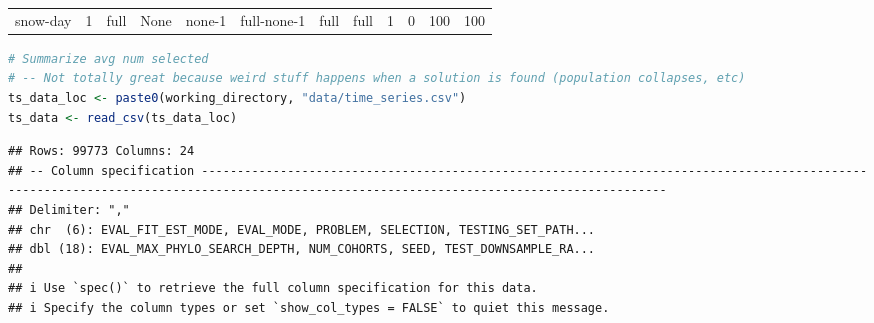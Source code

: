 \documentclass[
]{book}
\begin{document}
\begin{table}
\begin{tabular}{l|l|l|l|l|l|l|l|l|r|r|r}
\hline
\cellcolor{gray!6}{snow-day} & \cellcolor{gray!6}{0.1} & \cellcolor{gray!6}{phylo-informed-sample} & \cellcolor{gray!6}{Ancestor} & \cellcolor{gray!6}{ancestor-8} & \cellcolor{gray!6}{phylo-informed-sample-ancestor-8} & \cellcolor{gray!6}{phylo-informed-sample} & \cellcolor{gray!6}{phylo-informed-sample} & \cellcolor{gray!6}{8} & \cellcolor{gray!6}{4} & \cellcolor{gray!6}{50} & \cellcolor{gray!6}{46}\\
\hline
snow-day & 1 & full & None & none-1 & full-none-1 & full & full & 1 & 0 & 100 & 100\\
\hline
\end{tabular}
\endgroup{}
\end{table}

\begin{lstlisting}[language=R]
# Summarize avg num selected
# -- Not totally great because weird stuff happens when a solution is found (population collapses, etc)
ts_data_loc <- paste0(working_directory, "data/time_series.csv")
ts_data <- read_csv(ts_data_loc)
\end{lstlisting}

\begin{lstlisting}
## Rows: 99773 Columns: 24
## -- Column specification -----------------------------------------------------------------------------------------------------------------------------------------------------------------------------------------
## Delimiter: ","
## chr  (6): EVAL_FIT_EST_MODE, EVAL_MODE, PROBLEM, SELECTION, TESTING_SET_PATH...
## dbl (18): EVAL_MAX_PHYLO_SEARCH_DEPTH, NUM_COHORTS, SEED, TEST_DOWNSAMPLE_RA...
## 
## i Use `spec()` to retrieve the full column specification for this data.
## i Specify the column types or set `show_col_types = FALSE` to quiet this message.
\end{lstlisting}
\end{document}
